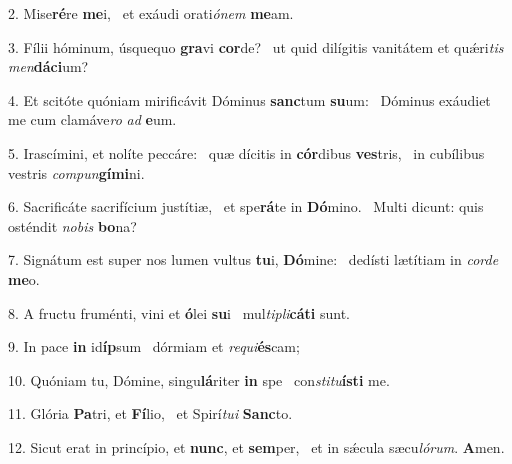 2. Mise\textbf{ré}re \textbf{me}i, \ast\  et exáudi orati\textit{ó}\textit{nem} \textbf{me}am.\

3. Fílii hóminum, úsquequo \textbf{gra}vi \textbf{cor}de? \ast\  ut quid dilígitis vanitátem et quǽri\textit{tis} \textit{men}\textbf{dá}\textbf{ci}um?\

4. Et scitóte quóniam mirificávit Dóminus \textbf{sanc}tum \textbf{su}um: \ast\  Dóminus exáudiet me cum clamáve\textit{ro} \textit{ad} \textbf{e}um.\

5. Irascímini, et nolíte peccáre: \dag\  quæ dícitis in \textbf{cór}dibus \textbf{ves}tris, \ast\  in cubílibus vestris \textit{com}\textit{pun}\textbf{gí}\textbf{mi}ni.\

6. Sacrificáte sacrifícium justítiæ, \dag\  et spe\textbf{rá}te in \textbf{Dó}mino. \ast\  Multi dicunt: quis osténdit \textit{no}\textit{bis} \textbf{bo}na?\

7. Signátum est super nos lumen vultus \textbf{tu}i, \textbf{Dó}mine: \ast\  dedísti lætítiam in \textit{cor}\textit{de} \textbf{me}o.\

8. A fructu fruménti, vini et \textbf{ó}lei \textbf{su}i \ast\  mul\textit{ti}\textit{pli}\textbf{cá}\textbf{ti} sunt.\

9. In pace \textbf{in} id\textbf{íp}sum \ast\  dórmiam et \textit{re}\textit{qui}\textbf{és}cam;\

10. Quóniam tu, Dómine, singu\textbf{lá}riter \textbf{in} spe \ast\  con\textit{sti}\textit{tu}\textbf{ís}\textbf{ti} me.\

11. Glória \textbf{Pa}tri, et \textbf{Fí}lio, \ast\  et Spirí\textit{tu}\textit{i} \textbf{Sanc}to.\

12. Sicut erat in princípio, et \textbf{nunc}, et \textbf{sem}per, \ast\  et in sǽcula sæcu\textit{ló}\textit{rum}. \textbf{A}men.\

